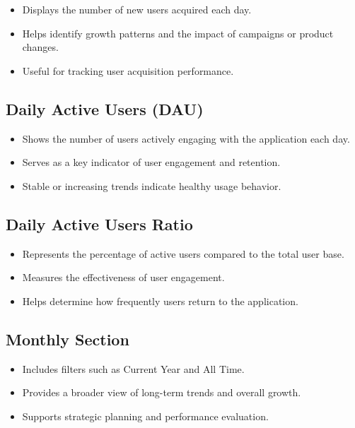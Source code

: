 \documentclass[12pt,oneside,openright,a4paper]{cpe-english-project}
\begin{document}
\begin{itemize}
\item
  Displays the number of new users acquired each day.
\item
  Helps identify growth patterns and the impact of campaigns or product
  changes.
\item
  Useful for tracking user acquisition performance.
\end{itemize}

\subsection{Daily Active Users (DAU)}

\begin{itemize}
\item
  Shows the number of users actively engaging with the application each
  day.
\item
  Serves as a key indicator of user engagement and retention.
\item
  Stable or increasing trends indicate healthy usage behavior.
\end{itemize}

\subsection{Daily Active Users Ratio}

\begin{itemize}
\item
  Represents the percentage of active users compared to the total user
  base.
\item
  Measures the effectiveness of user engagement.
\item
  Helps determine how frequently users return to the application.
\end{itemize}

\subsection{Monthly Section}

\begin{itemize}
\item
  Includes filters such as Current Year and All Time.
\item
  Provides a broader view of long-term trends and overall growth.
\item
  Supports strategic planning and performance evaluation.
\end{itemize}
\end{document}
